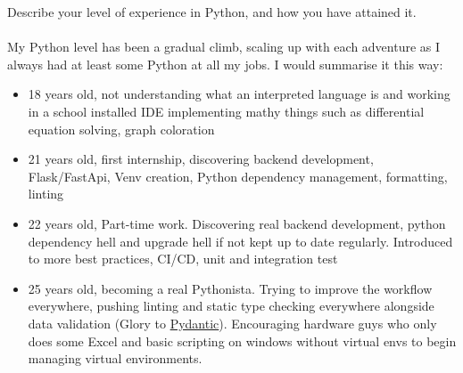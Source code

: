 \documentclass{exam}
\begin{document}
\begin{questions}

\question Describe your level of experience in Python, and how you have attained it.
\\~\\
My Python level has been a gradual climb, scaling up with each adventure as I always had at least some Python at all my jobs. I would summarise it this way:
\begin{itemize}
    \item 18 years old, not understanding what an interpreted language is and working in a school installed IDE implementing mathy things such as
differential equation solving, graph coloration
    \item 21 years old, first internship, discovering backend development, Flask/FastApi, Venv creation, Python dependency management, formatting, linting
    \item 22 years old, Part-time work. Discovering real backend development, python dependency hell and upgrade hell if not kept up to date regularly. Introduced to more best practices, CI/CD, unit and integration test
    \item 25 years old, becoming a real Pythonista. Trying to improve the workflow everywhere, pushing linting and static type checking everywhere alongside data validation (Glory to \href{https://docs.pydantic.dev/latest/}{Pydantic}). Encouraging hardware guys who only does some Excel and basic scripting on windows without virtual envs to begin managing virtual environments.
\end{itemize}


\end{questions}
\end{document}
